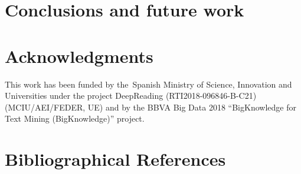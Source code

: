 \documentclass[10pt, a4paper]{article}
\begin{document}



\section{Conclusions and future work}\label{sec:concl-future-work}

\section*{Acknowledgments}

This work has been funded by the~Spanish Ministry of Science, Innovation and Universities under the project DeepReading (RTI2018-096846-B-C21) (MCIU/AEI/FEDER, UE) and by the BBVA Big Data 2018 ``BigKnowledge for Text Mining (BigKnowledge)'' project.

\section{Bibliographical References}



\end{document}
